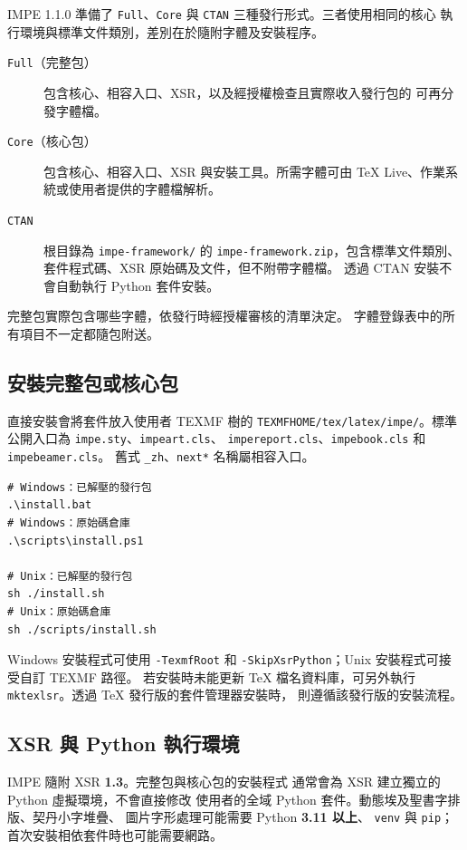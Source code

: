 \documentclass[11pt,lang=zh]{impeart}
\begin{document}
IMPE 1.1.0 準備了 \texttt{Full}、\texttt{Core} 與
\texttt{CTAN} 三種發行形式。三者使用相同的核心
\XeLaTeX{} 執行環境與標準文件類別，差別在於隨附字體及安裝程序。

\begin{description}
  \item[\texttt{Full}（完整包）]
    包含核心、相容入口、XSR，以及經授權檢查且實際收入發行包的
    可再分發字體檔。
  \item[\texttt{Core}（核心包）]
    包含核心、相容入口、XSR 與安裝工具。所需字體可由
    \TeX{} Live、作業系統或使用者提供的字體檔解析。
  \item[\texttt{CTAN}]
    根目錄為 \texttt{impe-framework/} 的
    \texttt{impe-framework.zip}，包含標準文件類別、
    套件程式碼、XSR 原始碼及文件，但不附帶字體檔。
    透過 CTAN 安裝不會自動執行 Python 套件安裝。
\end{description}

完整包實際包含哪些字體，依發行時經授權審核的清單決定。
字體登錄表中的所有項目不一定都隨包附送。

\subsection{安裝完整包或核心包}

直接安裝會將套件放入使用者 TEXMF 樹的
\texttt{TEXMFHOME/tex/latex/impe/}。標準公開入口為
\texttt{impe.sty}、\texttt{impeart.cls}、
\texttt{impereport.cls}、\texttt{impebook.cls}
和 \texttt{impebeamer.cls}。
舊式 \texttt{\_zh}、\texttt{next*} 名稱屬相容入口。

\begin{verbatim}
# Windows：已解壓的發行包
.\install.bat
# Windows：原始碼倉庫
.\scripts\install.ps1

# Unix：已解壓的發行包
sh ./install.sh
# Unix：原始碼倉庫
sh ./scripts/install.sh
\end{verbatim}

Windows 安裝程式可使用 \texttt{-TexmfRoot} 和
\texttt{-SkipXsrPython}；Unix 安裝程式可接受自訂 TEXMF 路徑。
若安裝時未能更新 \TeX{} 檔名資料庫，可另外執行
\texttt{mktexlsr}。透過 \TeX{} 發行版的套件管理器安裝時，
則遵循該發行版的安裝流程。

\subsection{XSR 與 Python 執行環境}

IMPE 隨附 XSR \textbf{1.3}。完整包與核心包的安裝程式
通常會為 XSR 建立獨立的 Python 虛擬環境，不會直接修改
使用者的全域 Python 套件。動態埃及聖書字排版、契丹小字堆疊、
圖片字形處理可能需要 Python \textbf{3.11 以上}、
\texttt{venv} 與 \texttt{pip}；首次安裝相依套件時也可能需要網路。
\end{document}
